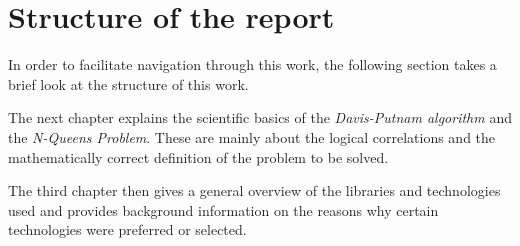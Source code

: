 \section{Structure of the report}
\label{sec:introStructure}
In order to facilitate navigation through this work, the following section takes a brief look at the structure of this work.

The next chapter explains the scientific basics of the \textit{Davis-Putnam algorithm} and the \textit{N-Queens Problem}. These are mainly about the logical correlations and the mathematically correct definition of the problem to be solved.

The third chapter then gives a general overview of the libraries and technologies used and provides background information on the reasons why certain technologies were preferred or selected.


